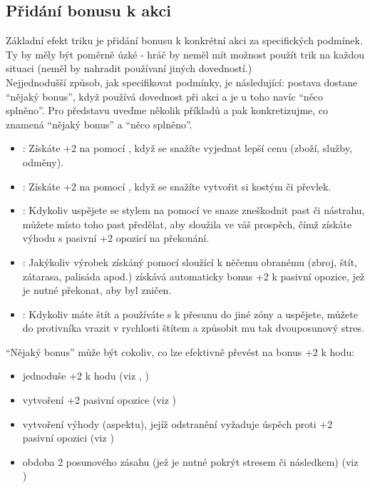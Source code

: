 \subsection{Přidání bonusu k akci}
\label{sec:trik-bonus}
Základní efekt triku je přidání bonusu k konkrétní akci za specifických podmínek. Ty by měly být poměrně úzké - hráč by neměl mít možnost použít trik na každou situaci (neměl by nahradit používaní jiných dovedností.)\\
Nejjednodušší způsob, jak specifikovat podmínky, je následující: postava dostane ``nějaký bonus'', když používá dovednost  při akci  a je u toho navíc ``něco splněno''. Pro představu uveďme několik příkladů a pak konkretizujme, co znamená ``nějaký bonus'' a ``něco splněno''.

\begin{itemize}
\item {}:
  Získáte +2 na  pomocí , když se snažíte vyjednat lepší cenu (zboží, služby, odměny).
\item {}:
  Získáte +2 na  pomocí , když se snažíte vytvořit si kostým či převlek.
\item {}:
  Kdykoliv uspějete se stylem na  pomocí  ve snaze zneškodnit past či nástrahu, můžete místo toho past předělat, aby sloužila ve váš prospěch, čímž získáte výhodu  s pasivní +2 opozicí na překonání.
\item {}:
  Jakýkoliv výrobek získáný  pomocí  sloužící k něčemu obranému (zbroj, štít, zátarasa, palisáda apod.) získává automaticky bonus +2 k pasivní opozice, jež je nutné překonat, aby byl zničen.
\item {}:
  Kdykoliv máte štít a používáte  s  k přesunu do jiné zóny a uspějete, můžete do protivníka vrazit v rychlosti štítem a způsobit mu tak dvouposunový stres.

\end{itemize}
``Nějaký bonus'' může být cokoliv, co lze efektivně převést na bonus +2 k hodu:

\begin{itemize}
\item jednoduše +2 k hodu (viz , )
\item vytvoření +2 pasivní opozice (viz )
\item vytvoření výhody (aspektu), jejíž odstranění vyžaduje úspěch proti +2 pasivní opozici (viz )
\item obdoba 2 posunového zásahu (jež je nutné pokrýt stresem či následkem) (viz )
\end{itemize}

